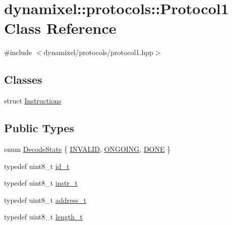 \hypertarget{classdynamixel_1_1protocols_1_1_protocol1}{}\section{dynamixel\+:\+:protocols\+:\+:Protocol1 Class Reference}
\label{classdynamixel_1_1protocols_1_1_protocol1}


{\ttfamily \#include $<$dynamixel/protocols/protocol1.\+hpp$>$}

\subsection*{Classes}
\begin{DoxyCompactItemize}
\item 
struct \hyperlink{structdynamixel_1_1protocols_1_1_protocol1_1_1_instructions}{Instructions}
\end{DoxyCompactItemize}
\subsection*{Public Types}
\begin{DoxyCompactItemize}
\item 
enum \hyperlink{classdynamixel_1_1protocols_1_1_protocol1_a84867f282d00506d43ebca811925fbcc}{Decode\+State} \{ \hyperlink{classdynamixel_1_1protocols_1_1_protocol1_a84867f282d00506d43ebca811925fbcca2735c69e905cf95470f9e383355a130b}{I\+N\+V\+A\+L\+I\+D}, 
\hyperlink{classdynamixel_1_1protocols_1_1_protocol1_a84867f282d00506d43ebca811925fbcca527e017e69d1c32dd1cbf06765d71d78}{O\+N\+G\+O\+I\+N\+G}, 
\hyperlink{classdynamixel_1_1protocols_1_1_protocol1_a84867f282d00506d43ebca811925fbccac417bdba2b956d4e604a2765a656c84c}{D\+O\+N\+E}
 \}
\item 
typedef uint8\+\_\+t \hyperlink{classdynamixel_1_1protocols_1_1_protocol1_a1d4dfa22b01f80b1876d14f539d52b5c}{id\+\_\+t}
\item 
typedef uint8\+\_\+t \hyperlink{classdynamixel_1_1protocols_1_1_protocol1_a572dc8c0871ecdf3d62c4f58fbcfd454}{instr\+\_\+t}
\item 
typedef uint8\+\_\+t \hyperlink{classdynamixel_1_1protocols_1_1_protocol1_a4383ba392b57ea00dd0273c6da5e8a65}{address\+\_\+t}
\item 
typedef uint8\+\_\+t \hyperlink{classdynamixel_1_1protocols_1_1_protocol1_acd6456c39a2f75de2db3d730941027cc}{length\+\_\+t}
\end{DoxyCompactItemize}
